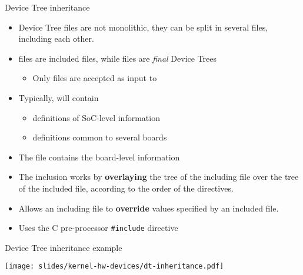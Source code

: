 \begin{frame}[fragile]{Device Tree inheritance}
  \begin{itemize}
  \item Device Tree files are not monolithic, they can be split in
    several files, including each other.
  \item {} files are included files, while  files
    are {\em final} Device Trees
    \begin{itemize}
    \item Only  files are accepted as input to 
    \end{itemize}
  \item Typically,  will contain
    \begin{itemize}
    \item definitions of SoC-level information
    \item definitions common to several boards
    \end{itemize}
  \item The  file contains the board-level information
  \item The inclusion works by {\bf overlaying} the tree of the
    including file over the tree of the included file, according
    to the order of the  directives.
  \item Allows an including file to {\bf override} values specified by
    an included file.
  \item Uses the C pre-processor {\tt \#include} directive
  \end{itemize}
\end{frame}

\begin{frame}{Device Tree inheritance example}
  \begin{center}
    \texttt{[image: slides/kernel-hw-devices/dt-inheritance.pdf]}
  \end{center}
\end{frame}


